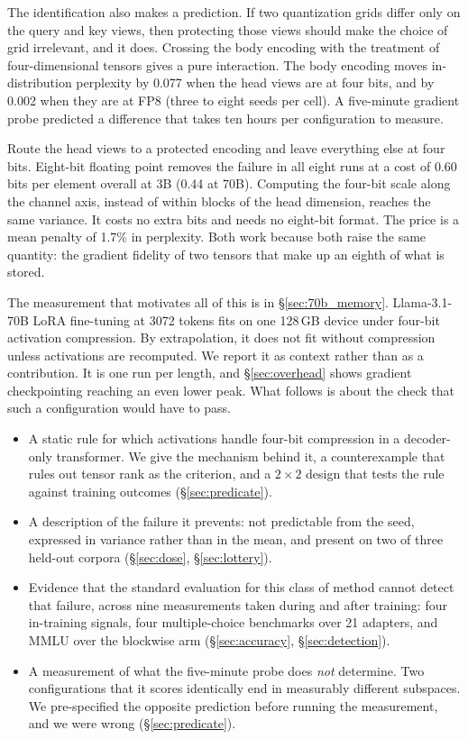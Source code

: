 \documentclass[11pt,letterpaper]{article}
\begin{document}
The identification also makes a prediction. If two quantization grids differ only on the query and key views, then protecting those views should make the choice of grid irrelevant, and it does. Crossing the body encoding with the treatment of four-dimensional tensors gives a pure interaction. The body encoding moves in-distribution perplexity by 0.077 when the head views are at four bits, and by 0.002 when they are at FP8 (three to eight seeds per cell). A five-minute gradient probe predicted a difference that takes ten hours per configuration to measure.

Route the head views to a protected encoding and leave everything else at four bits. Eight-bit floating point removes the failure in all eight runs at a cost of 0.60 bits per element overall at 3B (0.44 at 70B). Computing the four-bit scale along the channel axis, instead of within blocks of the head dimension, reaches the same variance. It costs no extra bits and needs no eight-bit format. The price is a mean penalty of 1.7\% in perplexity. Both work because both raise the same quantity: the gradient fidelity of two tensors that make up an eighth of what is stored.

The measurement that motivates all of this is in \S\ref{sec:70b_memory}. Llama-3.1-70B LoRA fine-tuning at 3072 tokens fits on one 128\,GB device under four-bit activation compression. By extrapolation, it does not fit without compression unless activations are recomputed. We report it as context rather than as a contribution. It is one run per length, and \S\ref{sec:overhead} shows gradient checkpointing reaching an even lower peak. What follows is about the check that such a configuration would have to pass.

\begin{itemize}\itemsep2pt 
\item A static rule for which activations handle four-bit compression in a decoder-only transformer. We give the mechanism behind it, a counterexample that rules out tensor rank as the criterion, and a $2 \times 2$ design that tests the rule against training outcomes (\S\ref{sec:predicate}). 
\item A description of the failure it prevents: not predictable from the seed, expressed in variance rather than in the mean, and present on two of three held-out corpora (\S\ref{sec:dose}, \S\ref{sec:lottery}). 
\item Evidence that the standard evaluation for this class of method cannot detect that failure, across nine measurements taken during and after training: four in-training signals, four multiple-choice benchmarks over 21 adapters, and MMLU over the blockwise arm (\S\ref{sec:accuracy}, \S\ref{sec:detection}). 
\item A measurement of what the five-minute probe does \emph{not} determine. Two configurations that it scores identically end in measurably different subspaces. We pre-specified the opposite prediction before running the measurement, and we were wrong (\S\ref{sec:predicate}). 
\end{itemize}
\end{document}
